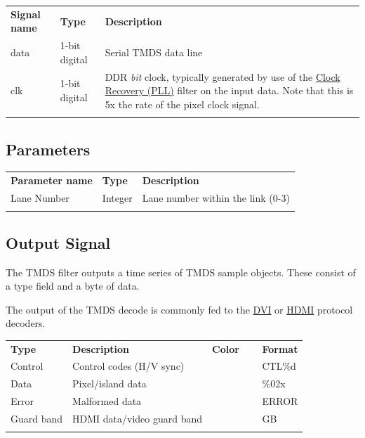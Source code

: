 \begin{tabularx}{16cm}{llX}
\thickhline
\textbf{Signal name} & \textbf{Type} & \textbf{Description} \\
\thickhline
data & 1-bit digital & Serial TMDS data line \\
\thickhline
clk & 1-bit digital & DDR \emph{bit} clock, typically generated by use of the \hyperref[filter:cdrpll]{Clock Recovery
(PLL)} filter on the input data. Note that this is 5x the rate of the pixel clock signal. \\
\thickhline
\end{tabularx}

\subsection{Parameters}

\begin{tabularx}{16cm}{llX}
\thickhline
\textbf{Parameter name} & \textbf{Type} & \textbf{Description} \\
\thickhline
Lane Number & Integer & Lane number within the link (0-3)\\
\thickhline
\end{tabularx}

\subsection{Output Signal}

The TMDS filter outputs a time series of TMDS sample objects. These consist of a type field and a byte of data.

The output of the TMDS decode is commonly fed to the \hyperref[filter:dvi]{DVI} or \hyperref[filter:hdmi]{HDMI}
protocol decoders.

\begin{tabularx}{16cm}{lllX}
\thickhline
\textbf{Type} & \textbf{Description} & \textbf{Color} & \textbf{Format} \\
\thickhline
Control & Control codes (H/V sync) & \cellcolor{control}\textcolor{white}{Control} & CTL\%d \\
\thickhline
Data & Pixel/island data & \cellcolor{data}\textcolor{white}{Data} & \%02x \\
\thickhline
Error & Malformed data & \cellcolor{error}\textcolor{white}{Error} & ERROR \\
\thickhline
Guard band & HDMI data/video guard band & \cellcolor{preamble}\textcolor{white}{Preamble} & GB \\
\thickhline
\end{tabularx}

